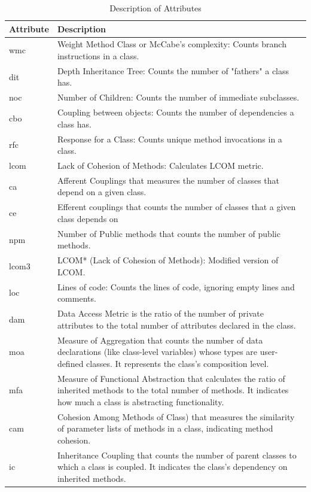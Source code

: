\documentclass[sigconf,review,anonymous,nonacm=true]{acmart}
\begin{document}
\begin{table}[h]
\centering
\caption{Description of Attributes}
\label{tab:attributes}
\begin{tabular}{|l|p{7cm}|} %
\hline
\textbf{Attribute} & \textbf{Description} \\ \hline
wmc & Weight Method Class or McCabe's complexity: Counts branch instructions in a class. \\ \hline
dit & Depth Inheritance Tree: Counts the number of "fathers" a class has. \\ \hline
noc & Number of Children: Counts the number of immediate subclasses. \\ \hline
cbo & Coupling between objects: Counts the number of dependencies a class has. \\ \hline
rfc & Response for a Class: Counts unique method invocations in a class. \\ \hline
lcom & Lack of Cohesion of Methods: Calculates LCOM metric. \\ \hline
ca & Afferent Couplings that measures the number of classes that depend on a given class. \\ \hline
ce & Efferent couplings that counts the number of classes that a given class depends on\\ \hline
npm & Number of Public methods that counts the number of public methods. \\ \hline
lcom3 & LCOM* (Lack of Cohesion of Methods): Modified version of LCOM. \\ \hline
loc & Lines of code: Counts the lines of code, ignoring empty lines and comments. \\ \hline
dam & Data Access Metric is the ratio of the number of private attributes to the total number of attributes declared in the
class. \\ \hline
moa & Measure of Aggregation that counts the number of data declarations (like class-level variables) whose types are user-defined classes. It represents the class's composition level.\\ \hline
mfa & Measure of Functional Abstraction that calculates the ratio of inherited methods to the total number of methods. It indicates how much a class is abstracting functionality.\\ \hline
cam & Cohesion Among Methods of Class) that measures the similarity of parameter lists of methods in a class, indicating method cohesion.\\ \hline
ic & Inheritance Coupling that counts the number of parent classes to which a class is coupled. It indicates the class's dependency on inherited methods.\\ \hline

\end{tabular}
\end{table}
\end{document}
